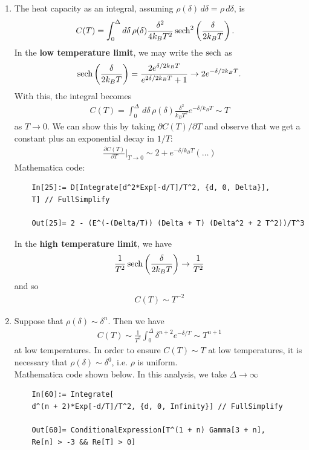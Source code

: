 \documentclass{article}
\theoremstyle{definition}
\newcommand{\p}{\partial}
\newcommand{\f}[2]{\frac{#1}{#2}}
\newcommand{\lp}{\left(}
\newcommand{\rp}{\right)}
\begin{document}
\begin{enumerate}[label=(\alph*)]
	\item The heat capacity as an integral, assuming $\rho(\delta)\,d\delta = \rho \,d\delta$, is 
	\begin{align*}
	C(T) 
	&= \int_0^\Delta d\delta\, \rho(\delta) \f{\delta^2}{4k_BT^2}\sech^2\lp \f{\delta}{2k_BT} \rp.
	\end{align*}
	In the \textbf{low temperature limit}, we may write the $\sech$ as 
	\begin{align*}
	\sech\lp \f{\delta}{ 2k_BT} \rp = \f{2e^{\delta/2k_BT}}{e^{2\delta/2k_BT}  + 1} \to  2e^{-\delta/2k_BT}.
	\end{align*}
	With this, the integral becomes
	\begin{align*}
	C(T) = \int^\Delta_0 \,d\delta \,\rho(\delta)\f{\delta^2}{k_BT^2} e^{-\delta/k_BT} \sim \boxed{T}
	\end{align*}
	as $T\to 0$. We can show this by taking $\p C(T)/\p T$ and observe that we get a constant plus an exponential decay in $1/T$:
	\begin{align*}
	\f{\p C(T)}{\p T}\bigg\vert_{T\to 0} \sim 2 + e^{-\delta/k_BT}(\dots)
	\end{align*}
	Mathematica code:
	\begin{lstlisting}
	In[25]:= D[Integrate[d^2*Exp[-d/T]/T^2, {d, 0, Delta}], 
	T] // FullSimplify
	
	Out[25]= 2 - (E^(-(Delta/T)) (Delta + T) (Delta^2 + 2 T^2))/T^3
	\end{lstlisting}
	
	In the \textbf{high temperature limit}, we have
	\begin{align*}
	\f{1}{T^2} \sech\lp \f{\delta}{2k_BT} \rp \to \f{1}{T^2}
	\end{align*}
	and so 
	\begin{align*}
	C(T) \sim \boxed{T^{-2}}
	\end{align*}
	
	\item Suppose that $\rho(\delta) \sim \delta^{n}$. Then we have
	\begin{align*}
	C(T) \sim \f{1}{T^2}\int_0^\Delta \delta^{n+2} e^{-\delta/T} \sim T^{n+1}
	\end{align*}
	at low temperatures. In order to ensure $C(T) \sim T$ at low temperatures, it is necessary that $\rho(\delta) \sim \delta^0$, i.e.  $\rho$ is uniform. \\
	
	
	Mathematica code shown below. In this analysis, we take $\Delta \to \infty$ 
	\begin{lstlisting}
	In[60]:= Integrate[
	d^(n + 2)*Exp[-d/T]/T^2, {d, 0, Infinity}] // FullSimplify
	
	Out[60]= ConditionalExpression[T^(1 + n) Gamma[3 + n], 
	Re[n] > -3 && Re[T] > 0]
	\end{lstlisting}
\end{enumerate}
\end{document}
